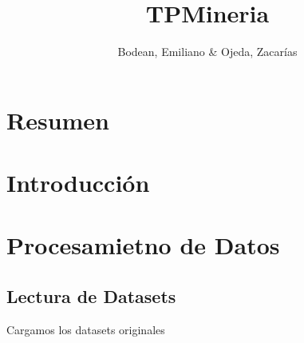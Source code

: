 \documentclass[runningheads,a4paper]{llncs}
\newenvironment{Shaded}{}{}
\newcommand{\KeywordTok}[1]{\textcolor[rgb]{0.00,0.44,0.13}{\textbf{{#1}}}}
\newcommand{\StringTok}[1]{\textcolor[rgb]{0.25,0.44,0.63}{{#1}}}
\newcommand{\CommentTok}[1]{\textcolor[rgb]{0.38,0.63,0.69}{\textit{{#1}}}}
\newcommand{\NormalTok}[1]{{#1}}
\newcommand{\OperatorTok}[1]{\textcolor[rgb]{0.40,0.40,0.40}{{#1}}}
\begin{document}
\title{TPMineria}
\author{Bodean, Emiliano \& Ojeda, Zacarías}



\institute{
}

%
\iffalse
\authorinfo{
  
}{
}{
  \{\}
}
\fi


\maketitle



\section{Resumen}\label{resumen}

\section{Introducción}\label{introduccion}

\section{Procesamietno de Datos}\label{procesamietno-de-datos}

\subsection{Lectura de Datasets}\label{lectura-de-datasets}

Cargamos los datasets originales

\begin{Shaded}
\end{Shaded}
\end{document}
